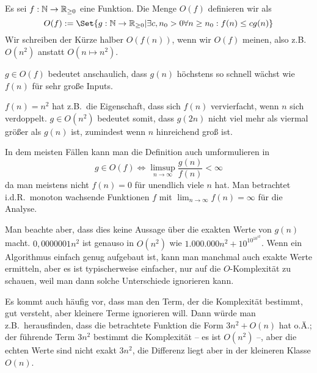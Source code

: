 \begin{definition}
    Es sei $f:\mathbb{N}\to\mathbb{R}_{\geq 0}$ eine Funktion. Die Menge $O(f)$ definieren wir als
    \[O(f) := \Set{g:\IN\to\IR_{\geq 0} | \exists c,n_0>0 \forall n\geq n_0: f(n) \leq c g(n)}\]
    Wir schreiben der Kürze halber $O(f(n))$, wenn wir $O(f)$ meinen, also z.B.\ $O(n^2)$ anstatt $O(n\mapsto n^2)$.
\end{definition}

\begin{remark}
    $g\in O(f)$ bedeutet anschaulich, dass $g(n)$ höchstens so schnell wächst wie $f(n)$ für sehr große Inputs.

    $f(n)=n^2$ hat z.B.\ die Eigenschaft, dass sich $f(n)$ vervierfacht, wenn $n$ sich verdoppelt. $g\in O(n^2)$ bedeutet somit, dass $g(2n)$ nicht viel mehr als viermal größer als $g(n)$ ist, zumindest wenn $n$ hinreichend groß ist.
\end{remark}
\begin{remark}
    In dem meisten Fällen kann man die Definition auch umformulieren in
    \[g\in O(f) \iff \limsup_{n\to\infty} \frac{g(n)}{f(n)} < \infty\]
    da man meistens nicht $f(n)=0$ für unendlich viele $n$ hat. Man betrachtet i.d.R.\ monoton wachsende Funktionen $f$ mit $\lim_{n\to\infty} f(n) = \infty$ für die Analyse.
\end{remark}
\begin{remark}
    Man beachte aber, dass dies keine Aussage über die exakten Werte von $g(n)$ macht. $0,0000001 n^2$ ist genauso in $O(n^2)$ wie $1.000.000n^2 + 10^{10^{10^{42}}}$. Wenn ein Algorithmus einfach genug aufgebaut ist, kann man manchmal auch exakte Werte ermitteln, aber es ist typischerweise einfacher, nur auf die $O$-Komplexität zu schauen, weil man dann solche Unterschiede ignorieren kann.

    Es kommt auch häufig vor, dass man den Term, der die Komplexität bestimmt, gut versteht, aber kleinere Terme ignorieren will. Dann würde man z.B.\ herausfinden, dass die betrachtete Funktion die Form $3n^2+O(n)$ hat o.Ä.; der führende Term $3n^2$ bestimmt die Komplexität -- es ist $O(n^2)$ --, aber die echten Werte sind nicht exakt $3n^2$, die Differenz liegt aber in der kleineren Klasse $O(n)$.
\end{remark}
